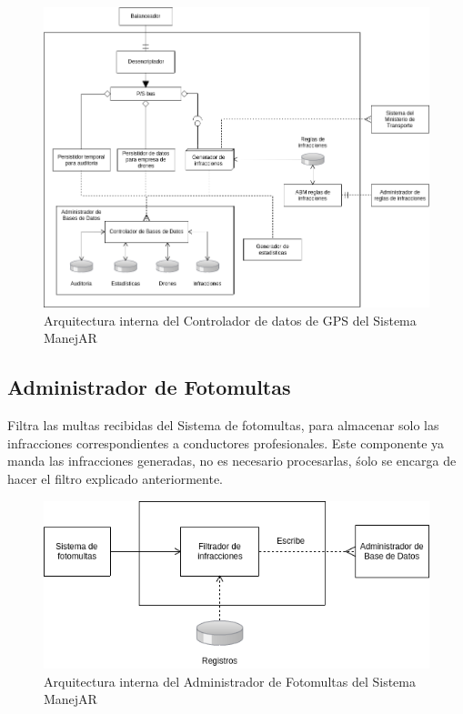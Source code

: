 \begin{figure}
\centerline{\includegraphics[width=1\textwidth]{./imagenes/arquitectura_tp2/controlador_datos_gps.png}}
\caption{Arquitectura interna del Controlador de datos de GPS del Sistema ManejAR}
\end{figure}


\subsection{Administrador de Fotomultas}
Filtra las multas recibidas del Sistema de fotomultas, para almacenar solo las 
infracciones correspondientes a conductores profesionales.
Este componente ya manda las infracciones generadas, no es necesario procesarlas,
śolo se encarga de hacer el filtro explicado anteriormente.

\begin{figure}
\centerline{\includegraphics[width=1\textwidth]{./imagenes/arquitectura_tp2/administrador_fotomultas.png}}
\caption{Arquitectura interna del Administrador de Fotomultas del Sistema ManejAR}
\end{figure}


